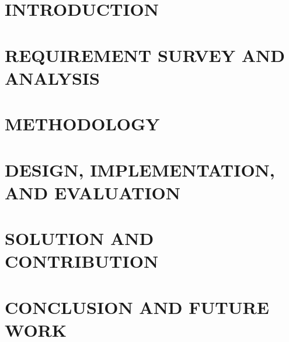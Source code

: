\documentclass[a4paper,13pt,3p,twoside]{report}
\theoremstyle{definition}
\begin{document}
\glsaddall
\renewcommand*{\acronymname}{LIST OF ABBREVIATIONS}
\renewcommand*{\entryname}{Abriviation}
\renewcommand*{\descriptionname}{Full Expression}
\printnoidxglossaries

% 

% 


\newpage
{}

\pagestyle{fancy}
\fancyhf{}
\fancyhead[RE, LO]{\leftmark}
\fancyfoot[RE, LO]{\thepage}

\chapter{INTRODUCTION}
\label{chapter:Introduction}

\newpage
\chapter{REQUIREMENT SURVEY AND ANALYSIS}
\label{chapter:Related_works}



\newpage
\chapter{METHODOLOGY}
\label{chapter:Methodology}


\newpage
\chapter{DESIGN, IMPLEMENTATION, AND EVALUATION}
\label{chapter:Experiment}


\newpage
\chapter{SOLUTION AND CONTRIBUTION}
\label{chapter:SolutionAndContribution}

\newpage
\chapter{CONCLUSION AND FUTURE WORK} %
\label{chapter:conclusion}

\end{document}
